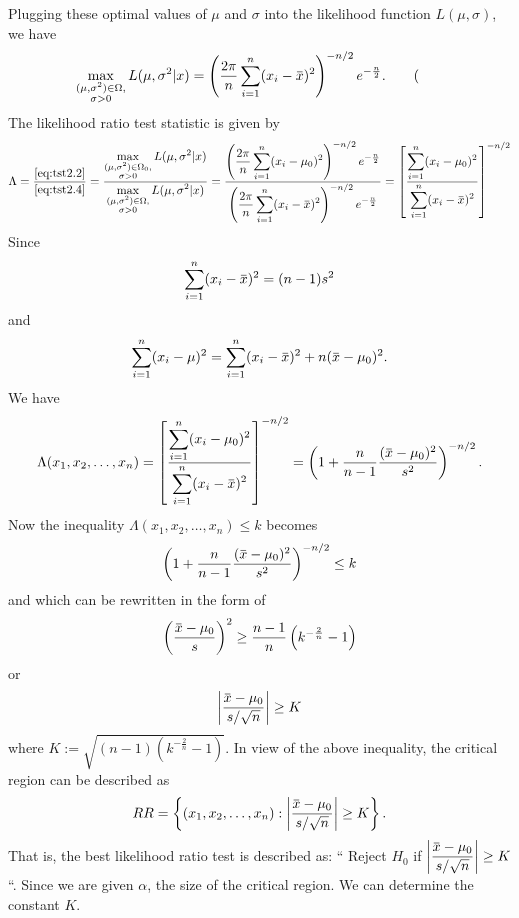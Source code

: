 \begin{solution}
    Plugging these optimal values of $\mu$ and $\sigma$ into the likelihood function $L(\mu, \sigma)$, we have
    \[
        \max_{\substack{(\mu, \sigma^2) \in \Omega,\\ \sigma > 0}} L(\mu, \sigma^2 | x) 
        = \left(\frac{2\pi}{n} \sum^n_{i=1} (x_i - \ols{x})^2 \right)^{-n/2} e^{-\frac{n}{2}}. \label{eq:tst2.4} \tag{\diabox1{cgreen}}
    \]
    The likelihood ratio test statistic is given by
    \begin{equation}
        \Lambda = \frac{\eqref{eq:tst2.2}}{\eqref{eq:tst2.4}} = \frac{\displaystyle \max_{\substack{(\mu, \sigma^2) \in \Omega_0,\\ \sigma > 0}}  L(\mu, \sigma^2 | x)}{\displaystyle \max_{\substack{(\mu, \sigma^2) \in \Omega,\\ \sigma > 0}} L(\mu, \sigma^2 | x)}\\
        = \frac{\displaystyle \left(\frac{2\pi}{n} \sum^n_{i=1} (x_i - \mu_0)^2 \right)^{-n/2} e^{-\frac{n}{2}}}{\displaystyle \left(\frac{2\pi}{n} \sum^n_{i=1} (x_i - \ols{x})^2 \right)^{-n/2} e^{-\frac{n}{2}}}
        = \left[ \frac{\displaystyle \sum_{i=1}^{n} (x_i - \mu_0)^2}{\displaystyle \sum_{i=1}^{n} (x_i - \ols{x})^2}\right]^{-n/2}
    \end{equation}
    Since
    \[
        \sum^n_{i=1} (x_i - \ols{x})^2 = (n-1)s^2
    \]
    and 
    \[
        \sum^n_{i=1} (x_i - \mu)^2 = \sum^n_{i=1} (x_i - \ols{x})^2 + n(\ols{x} - \mu_0)^2.
    \]
    We have 
    \[
        \Lambda(x_1, x_2, \ldots, x_n) = \left[ \frac{\displaystyle \sum_{i=1}^{n} (x_i - \mu_0)^2}{\displaystyle \sum_{i=1}^{n} (x_i - \ols{x})^2}\right]^{-n/2}
        = \left(1 + \frac{n}{n-1} \frac{(\ols{x} - \mu_0)^2}{s^2}\right)^{-n/2}.
    \]
    Now the inequality $\Lambda(x_1, x_2, \ldots, x_n) \leq k$ becomes
    \begin{equation}
        \left(1 + \frac{n}{n-1} \frac{(\ols{x} - \mu_0)^2}{s^2}\right)^{-n/2} \leq k
    \end{equation}
    and which can be rewritten in the form of 
    \[
        \left( \frac{\ols{x} - \mu_0}{s}\right)^2 \geq \frac{n-1}{n}\left( k^{-\frac{2}{n}} - 1 \right)
    \]
    or 
    \[
        \left\vert \frac{\ols{x} - \mu_0}{s/\sqrt{n}} \right\vert \geq K
    \]
    where $K := \sqrt{(n-1)\left( k^{-\frac{2}{n}} - 1 \right)}$. In view of the above inequality, 
    the critical region can be described as 
    \[
        RR = \left\{ (x_1, x_2, \ldots, x_n) : \left\vert \frac{\ols{x} - \mu_0}{s/\sqrt{n}} \right\vert \geq K \right\}.
    \]
    That is, the best likelihood ratio test is described as: ``
    Reject $H_0$ if $\displaystyle \left\vert \frac{\ols{x} - \mu_0}{s/\sqrt{n}} \right\vert \geq K$``. Since we are given $\alpha$, the size 
    of the critical region. We can determine the constant $K$.


\end{solution}
